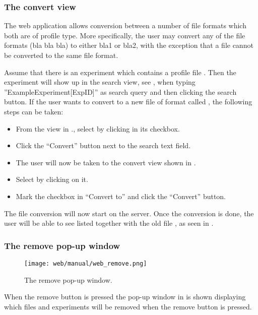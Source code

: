 \subsubsection{The convert view} \label{sssec:convertView}

The web application allows conversion between a number of file formats which both are of profile type. More specifically, the user may convert any of the file formats (bla bla bla) to either bla1 or bla2, with the exception that a file cannot be converted to the same file format.

Assume that there is an experiment  which contains a profile file . Then the experiment will show up in the search view, see , when typing ”ExampleExperiment[ExpID]” as search query and then clicking the search button. If the user wants to convert  to a new file of format  called , the following steps can be taken:
\begin{itemize}
	\item From the view in ., select  by clicking in its checkbox.
	\item Click the “Convert” button next to the search text field.
	\item The user will now be taken to the convert view shown in .
	\item Select  by clicking on it.
	\item Mark the  checkbox in “Convert to” and click the “Convert” button.
\end{itemize}

The file conversion will now start on the server. Once the conversion is done, the user will be able to see  listed together with the old file , as seen in .

\subsubsection{The remove pop-up window}
\begin{figure}[h]
\centering
\texttt{[image: web/manual/web\_remove.png]}
\caption{\label{fig:web_remove_removeFiles}The remove pop-up window.}
\end{figure}
\FloatBarrier
When the remove button is pressed the pop-up window in  is shown displaying which files and experiments will be removed when the remove button is pressed.


